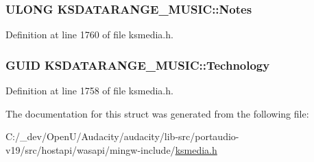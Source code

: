 \subsubsection[{\texorpdfstring{Notes}{Notes}}]{\setlength{\rightskip}{0pt plus 5cm}U\+L\+O\+NG K\+S\+D\+A\+T\+A\+R\+A\+N\+G\+E\+\_\+\+M\+U\+S\+I\+C\+::\+Notes}\hypertarget{struct_k_s_d_a_t_a_r_a_n_g_e___m_u_s_i_c_a6e8b0449adeee391c4487f92d9b80e9e}{}\label{struct_k_s_d_a_t_a_r_a_n_g_e___m_u_s_i_c_a6e8b0449adeee391c4487f92d9b80e9e}


Definition at line 1760 of file ksmedia.\+h.

\subsubsection[{\texorpdfstring{Technology}{Technology}}]{\setlength{\rightskip}{0pt plus 5cm}G\+U\+ID K\+S\+D\+A\+T\+A\+R\+A\+N\+G\+E\+\_\+\+M\+U\+S\+I\+C\+::\+Technology}\hypertarget{struct_k_s_d_a_t_a_r_a_n_g_e___m_u_s_i_c_a74fe1845e7debcf132cfaf65adebaf62}{}\label{struct_k_s_d_a_t_a_r_a_n_g_e___m_u_s_i_c_a74fe1845e7debcf132cfaf65adebaf62}


Definition at line 1758 of file ksmedia.\+h.



The documentation for this struct was generated from the following file\+:\begin{DoxyCompactItemize}
\item 
C\+:/\+\_\+dev/\+Open\+U/\+Audacity/audacity/lib-\/src/portaudio-\/v19/src/hostapi/wasapi/mingw-\/include/\hyperlink{ksmedia_8h}{ksmedia.\+h}\end{DoxyCompactItemize}
